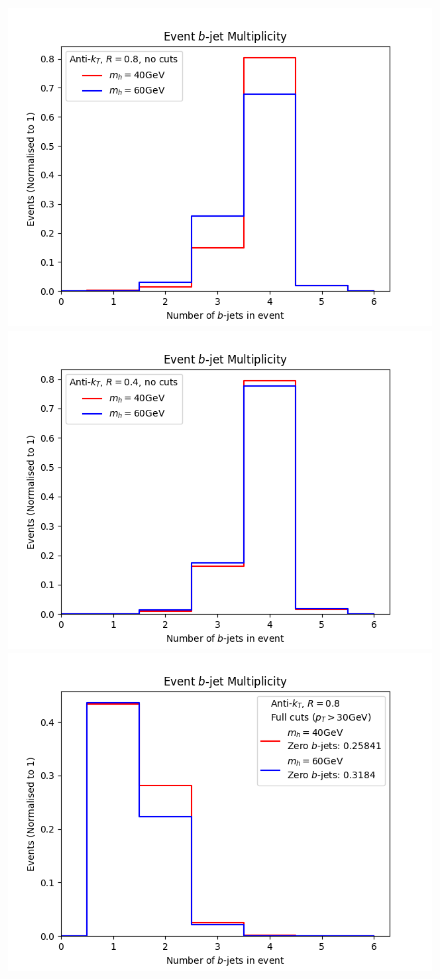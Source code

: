 \begin{figure}[t!]
	\includegraphics[scale=0.5]{plots/nbjets_AK8_nocuts.png}
	\includegraphics[scale=0.5]{plots/nbjets_AK4_nocuts.png}
	\includegraphics[scale=0.5]{plots/nbjets_AK8_pt30.png}

\end{figure}
